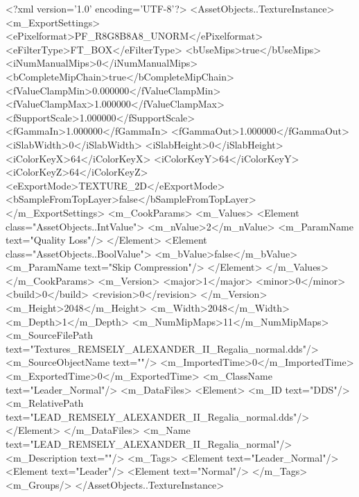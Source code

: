 <?xml version='1.0' encoding='UTF-8'?>
<AssetObjects..TextureInstance>
  <m_ExportSettings>
    <ePixelformat>PF_R8G8B8A8_UNORM</ePixelformat>
    <eFilterType>FT_BOX</eFilterType>
    <bUseMips>true</bUseMips>
    <iNumManualMips>0</iNumManualMips>
    <bCompleteMipChain>true</bCompleteMipChain>
    <fValueClampMin>0.000000</fValueClampMin>
    <fValueClampMax>1.000000</fValueClampMax>
    <fSupportScale>1.000000</fSupportScale>
    <fGammaIn>1.000000</fGammaIn>
    <fGammaOut>1.000000</fGammaOut>
    <iSlabWidth>0</iSlabWidth>
    <iSlabHeight>0</iSlabHeight>
    <iColorKeyX>64</iColorKeyX>
    <iColorKeyY>64</iColorKeyY>
    <iColorKeyZ>64</iColorKeyZ>
    <eExportMode>TEXTURE_2D</eExportMode>
    <bSampleFromTopLayer>false</bSampleFromTopLayer>
  </m_ExportSettings>
  <m_CookParams>
    <m_Values>
      <Element class="AssetObjects..IntValue">
        <m_nValue>2</m_nValue>
        <m_ParamName text="Quality Loss"/>
      </Element>
      <Element class="AssetObjects..BoolValue">
        <m_bValue>false</m_bValue>
        <m_ParamName text="Skip Compression"/>
      </Element>
    </m_Values>
  </m_CookParams>
  <m_Version>
    <major>1</major>
    <minor>0</minor>
    <build>0</build>
    <revision>0</revision>
  </m_Version>
  <m_Height>2048</m_Height>
  <m_Width>2048</m_Width>
  <m_Depth>1</m_Depth>
  <m_NumMipMaps>11</m_NumMipMaps>
  <m_SourceFilePath text="Textures\LEAD_REMSELY_ALEXANDER_II_Regalia_normal.dds"/>
  <m_SourceObjectName text=""/>
  <m_ImportedTime>0</m_ImportedTime>
  <m_ExportedTime>0</m_ExportedTime>
  <m_ClassName text="Leader_Normal"/>
  <m_DataFiles>
    <Element>
      <m_ID text="DDS"/>
      <m_RelativePath text="LEAD_REMSELY_ALEXANDER_II_Regalia_normal.dds"/>
    </Element>
  </m_DataFiles>
  <m_Name text="LEAD_REMSELY_ALEXANDER_II_Regalia_normal"/>
  <m_Description text=""/>
  <m_Tags>
    <Element text="Leader_Normal"/>
    <Element text="Leader"/>
    <Element text="Normal"/>
  </m_Tags>
  <m_Groups/>
</AssetObjects..TextureInstance>
